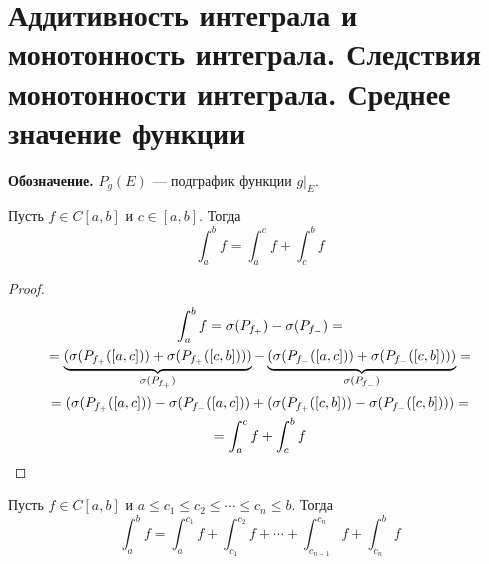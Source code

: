 \section{Аддитивность интеграла и монотонность интеграла. Следствия монотонности интеграла. Среднее значение функции}
\textbf{Обозначение.}
$P_{g}(E)$ --- подграфик функции $g|_{E}$.

\begin{theorem}
    Пусть $f \in C[a, b]$ и $c \in [a, b]$. Тогда
    \begin{equation*}
        \int_{a}^{b} f = \int_{a}^{c} f + \int_{c}^{b} f
    \end{equation*}
\end{theorem}
\begin{proof}
    \begin{equation*}
        \begin{gathered}
             \int_{a}^{b} f = \sigma(P_{f_{+}}) - \sigma(P_{f_{-}})
             = \\ =
             \underbrace{(\sigma(P_{f_{+}}([a, c])) +
             \sigma(P_{f_{+}}([c, b])))}_{\mathclap{\sigma(P_{f_{+}})}} -
             \underbrace{(\sigma(P_{f_{-}}([a, c])) +
             \sigma(P_{f_{-}}([c, b])))}_{\mathclap{\sigma(P_{f_{-}})}}
             = \\ =
             (\sigma(P_{f_{+}}([a, c])) -
             \sigma(P_{f_{-}}([a, c])) +
             (\sigma(P_{f_{+}}([c, b])) -
             \sigma(P_{f_{-}}([c, b])))
             = \\ =
             \int_{a}^{c} f + \int_{c}^{b} f
         \end{gathered}
    \end{equation*}
\end{proof}

\begin{follow}
    Пусть $f \in C[a, b]$ и $a \leq c_1 \leq c_2 \leq \dotsb \leq c_n \leq b$. Тогда
    \begin{equation*}
    \int_{a}^{b} f =
    \int_{a}^{c_1} f +
    \int_{c_1}^{c_2} f +
    \dotsb +
    \int_{c_{n - 1}}^{c_n} f +
    \int_{c_n}^{b} f
    \end{equation*}
\end{follow}

